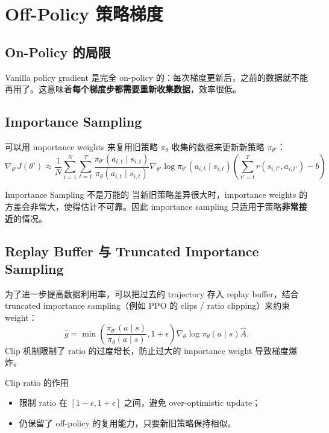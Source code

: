 \section{Off-Policy 策略梯度}

\subsection{On-Policy 的局限}

Vanilla policy gradient 是完全 on-policy 的：每次梯度更新后，之前的数据就不能再用了。这意味着\textbf{每个梯度步都需要重新收集数据}，效率很低。

\subsection{Importance Sampling}

可以用 importance weights 来复用旧策略 $\pi_\theta$ 收集的数据来更新新策略 $\pi_{\theta'}$：
$$\nabla_{\theta'} J(\theta') \approx \frac{1}{N}\sum_{i=1}^{N}\sum_{t=1}^{T} \frac{\pi_{\theta'}(a_{i,t} \mid s_{i,t})}{\pi_\theta(a_{i,t} \mid s_{i,t})} \nabla_{\theta'} \log \pi_{\theta'}(a_{i,t} \mid s_{i,t}) \left(\sum_{t'=t}^{T} r(s_{i,t'}, a_{i,t'}) - b\right)$$

\begin{warningbox}{Importance Sampling 不是万能的}
当新旧策略差异很大时，importance weights 的方差会非常大，使得估计不可靠。因此 importance sampling 只适用于策略\textbf{非常接近}的情况。
\end{warningbox}

\subsection{Replay Buffer 与 Truncated Importance Sampling}
为了进一步提高数据利用率，可以把过去的 trajectory 存入 replay buffer，结合 truncated importance sampling（例如 PPO 的 clips / ratio clipping）来约束 weight：
$$\hat{g} = \min\left(\frac{\pi_{\theta'}(a\mid s)}{\pi_\theta(a\mid s)}, 1+\epsilon\right) \nabla_\theta \log \pi_\theta(a\mid s) \hat{A}.$$
Clip 机制限制了 ratio 的过度增长，防止过大的 importance weight 导致梯度爆炸。

\begin{importantbox}{Clip ratio 的作用}
\begin{itemize}
    \item 限制 ratio 在 $[1-\epsilon,1+\epsilon]$ 之间，避免 over-optimistic update；
    \item 仍保留了 off-policy 的复用能力，只要新旧策略保持相似。
\end{itemize}
\end{importantbox}

